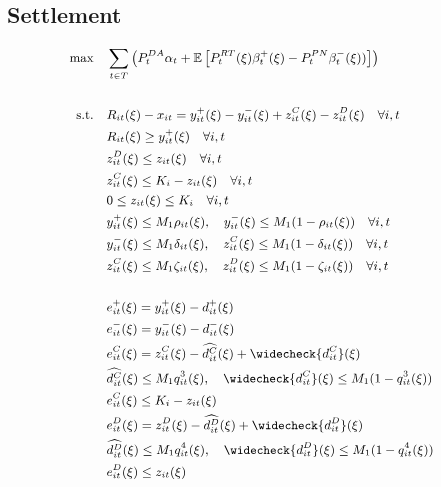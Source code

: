 \documentclass[10pt]{article}
\begin{document}
\subsection{Settlement}
\begin{subequations}
    \small
    \begin{align*}
    \text{max} \quad &\sum_{t\in T}\left(P_t^{DA}\alpha_t + \mathbb{E}\left[P_t^{RT}(\xi)\beta_{t}^{+}(\xi) - P_t^{PN}\beta_{t}^{-}(\xi))\right]\right)&\\   
    &&\\
    \text{s.t.} \quad &R_{it}(\xi) - x_{it} = y_{it}^{+}(\xi) - y_{it}^{-}(\xi) + z^C_{it}(\xi) - z^D_{it}(\xi)\quad  \forall i, t &\\ 
    &R_{it}(\xi) \geq y^+_{it}(\xi) \quad \forall i ,t &\\
    &z^D_{it}(\xi) \le z_{it}(\xi) \quad \forall i, t &\\
    &z^C_{it}(\xi) \le K_i-z_{it}(\xi) \quad \forall i, t &\\
    &0 \leq z_{it}(\xi) \leq K_i \quad \forall i, t &\\
    &y^+_{it}(\xi) \leq M_1 \rho_{it}(\xi), \quad y^-_{it}(\xi) \leq M_1 (1 - \rho_{it}(\xi)) \quad \forall i, t &\\
    &y^-_{it}(\xi) \leq M_1 \delta_{it}(\xi), \quad z^C_{it}(\xi) \leq M_1 (1 - \delta_{it}(\xi)) \quad \forall i, t &\\
    &z^C_{it}(\xi) \leq M_1 \zeta_{it}(\xi), \quad z^D_{it}(\xi) \leq M_1 (1 - \zeta_{it}(\xi)) \quad \forall i, t &\\
    &&\\
    &e^+_{it}(\xi) = y^+_{it}(\xi) - d^{+}_{it}(\xi) &\\
    &e^-_{it}(\xi) = y^-_{it}(\xi) - d^{-}_{it}(\xi) &\\
    &e^C_{it}(\xi) = z^C_{it}(\xi) - \widehat{d^{C}_{it}}(\xi) + \widecheck{d^{C}_{it}}(\xi) &\\
    &\widehat{d^{C}_{it}}(\xi) \leq M_1 q^3_{it}(\xi), \quad \widecheck{d^{C}_{it}}(\xi) \leq M_1 (1 - q^3_{it}(\xi)) &\\
    &e^C_{it}(\xi) \leq K_i - z_{it}(\xi)&\\
    &e^D_{it}(\xi) = z^D_{it}(\xi) - \widehat{d^{D}_{it}}(\xi) + \widecheck{d^{D}_{it}}(\xi) &\\
    &\widehat{d^{D}_{it}}(\xi) \leq M_1 q^4_{it}(\xi), \quad \widecheck{d^{D}_{it}}(\xi) \leq M_1 (1 - q^4_{it}(\xi)) &\\
    &e^D_{it}(\xi) \leq z_{it}(\xi)&\\

\end{align*}
\end{subequations}
\end{document}
